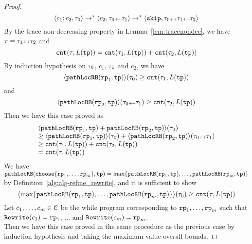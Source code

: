\begin{proof}
\[
  \langle c_1; c_2, \mathtt{\tau}_0 \rangle \to^* \langle c_2, \mathtt{\tau}_0 {\scriptscriptstyle ++} \mathtt{\tau}_1 \rangle \to^* \langle \mathtt{skip}, \mathtt{\tau}_0 {\scriptscriptstyle ++} \mathtt{\tau}_1 {\scriptscriptstyle ++} \mathtt{\tau}_2 \rangle
\]
By the trace non-decreasing property in Lemma~\ref{lem:tracenondec}, we have $\mathtt{\tau} = \mathtt{\tau}_1 {\scriptscriptstyle ++} \mathtt{\tau}_2$ and 
\[
  \mathtt{cnt}(\mathtt{\tau}, L(\mathtt{tp}))  = \mathtt{cnt}(\mathtt{\tau}_1, L(\mathtt{tp}))  + \mathtt{cnt}(\mathtt{\tau}_2, L(\mathtt{tp})) 
\]
By induction hypothesis on $\mathtt{\tau}_0$, $c_1$, $\mathtt{\tau}_1$ and $c_2$, we have
\[
  \langle \mathtt{pathLocRB}(\mathtt{rp}_1, \mathtt{tp}) \rangle(\mathtt{\tau}_0) \geq \mathtt{cnt}(\mathtt{\tau}_1, L(\mathtt{tp})) 
\]
 and 
  \[
    \langle \mathtt{pathLocRB}(\mathtt{rp}_2, \mathtt{tp}) \rangle(\mathtt{\tau}_0 {\scriptscriptstyle ++} \mathtt{\tau}_1) \geq \mathtt{cnt}(\mathtt{\tau}_2, L(\mathtt{tp})) 
  \]
Then we have this case proved as
\[
  \begin{array}{l}
  \langle \mathtt{pathLocRB}(\mathtt{rp}_1, \mathtt{tp}) + \mathtt{pathLocRB}(\mathtt{rp}_2, \mathtt{tp}) \rangle(\mathtt{\tau}_0)
  \\
  \geq \langle \mathtt{pathLocRB}(\mathtt{rp}_1, \mathtt{tp}) \rangle(\mathtt{\tau}_0) + \langle \mathtt{pathLocRB}(\mathtt{rp}_2, \mathtt{tp}) \rangle(\mathtt{\tau}_0 {\scriptscriptstyle ++} \mathtt{\tau}_1)
  \\
  \geq \mathtt{cnt}(\mathtt{\tau}_1, L(\mathtt{tp}))  + \mathtt{cnt}(\mathtt{\tau}_2, L(\mathtt{tp})) 
  \\
  = \mathtt{cnt}(\mathtt{\tau}, L(\mathtt{tp}))
  \end{array}
  \] 
We have $\outinB(\rpchoose{\rprog_1, \ldots, \rprog_m }, \tpath) = \max\left\{ \outinB(\rprog_1, \tpath), \ldots, \outinB(\rprog_m, \tpath) \right\}$ by Definition~\ref{alg:alg-refine_rewrite}, and
it is sufficient to show
\[
  \config{\max\left\{ \outinB(\rprog_1, \tpath), \ldots, \outinB(\rprog_m, \tpath) \right\}}(\trace_0) \geq \counter(\trace, L(\tpath)) 
\]
Let $c_1, \ldots, c_m \in \mathcal{C}$ be the while program corresponding to $\mathtt{rp}_1, \ldots, \mathtt{rp}_m$ such that $\mathtt{Rewrite}(c_1) = \mathtt{rp}_1$, $\ldots$ and  $\mathtt{Rewrite}(c_m) = \mathtt{rp}_m$.
\\
Then we have this case proved in the same procedure as the previous case by induction hypothesis and taking the maximum value overall bounds.
\end{proof}
